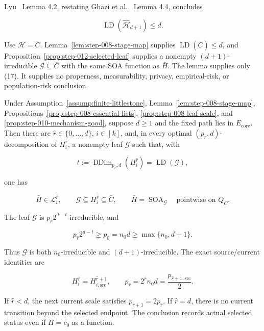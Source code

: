 Lyu~\citep{lyu2025} Lemma 4.2, restating Ghazi et al.~\citep{ghazi2020} Lemma 4.4, concludes

\[
 \operatorname{LD}(\widehat{\mathcal H}_{d+1})\le d.
\tag{17}
\]

Use \(\mathcal H=\bar C\). Lemma~\ref{lem:step-008-stage-map} supplies
\(\operatorname{LD}(\bar C)\le d\), and
Proposition~\ref{prop:step-012-selected-leaf} supplies a nonempty
\((d+1)\)-irreducible \(\mathcal G\subseteq\bar C\) with the same SOA
function as \(\bar H\). The lemma supplies only (17). It supplies no
properness, measurability, privacy, empirical-risk, or population-risk
conclusion.

\begin{proposition}\label{prop:step-012-selected-leaf}
Under Assumption~\ref{assump:finite-littlestone}, Lemma~\ref{lem:step-008-stage-map}, 
Propositions~\ref{prop:step-008-essential-lists},
\ref{prop:step-008-leaf-scale}, and
\ref{prop:step-010-mechanism-good}, suppose \(d\ge1\) and the fixed path
lies in \(E_{\mathrm{core}}\). Then there are
\(\widehat r\in\{0,\ldots,d\}\), \(i\in[k]\), and, in every optimal
\((p_{\widehat r},d)\)-decomposition of
\(H_i^{\widehat r}\), a nonempty leaf \(\mathcal G\) such that, with

\[
 t:=\operatorname{DDim}_{p_{\widehat r},d}(H_i^{\widehat r})
   =\operatorname{LD}(\mathcal G),
\tag{18}
\]

one has

\[
 \bar H\in\mathcal L_i^{\widehat r},
 \qquad
 \mathcal G\subseteq H_i^{\widehat r}\subseteq\bar C,
 \qquad
 \bar H=\operatorname{SOA}_{\mathcal G}
 \quad\text{pointwise on }Q_C.
\tag{19}
\]

The leaf \(\mathcal G\) is
\(p_{\widehat r}2^{d-t}\)-irreducible, and

\[
 p_{\widehat r}2^{d-t}
 \ge p_0=n_0d
 \ge\max\{n_0,d+1\}.
\tag{20}
\]

Thus \(\mathcal G\) is both \(n_0\)-irreducible and
\((d+1)\)-irreducible. The exact source/current identities are

\[
 H_i^{\widehat r}=H_{i,\mathrm{src}}^{\widehat r+1},
 \qquad
 p_{\widehat r}
 =2^{\widehat r}n_0d
 =\frac{p_{\widehat r+1,\mathrm{src}}}{2}.
\tag{21}
\]

If \(\widehat r<d\), the next current scale satisfies
\(p_{\widehat r+1}=2p_{\widehat r}\). If \(\widehat r=d\), there is no
current transition beyond the selected endpoint. The conclusion records
actual selected status even if \(\bar H=\bar c_0\) as a function.


\end{proposition}

